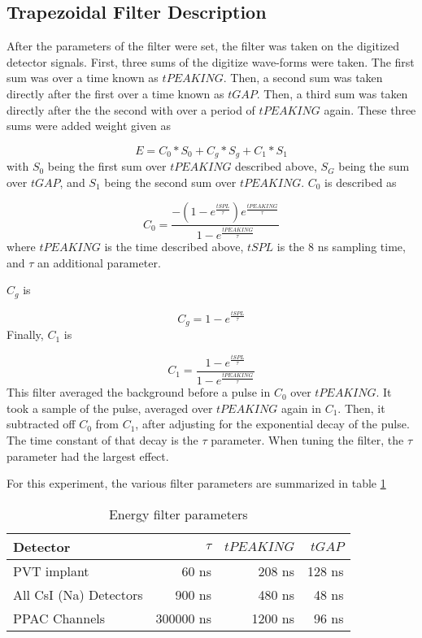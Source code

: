 \documentclass[../MaxHughesThesis.tex]{subfiles}
\begin{document}
\subsection{Trapezoidal Filter Description}
After the parameters of the filter were set, the filter was taken on the digitized detector signals.
First, three sums of the digitize wave-forms were taken.
The first sum was over a time known as $tPEAKING$.
Then, a second sum was taken directly after the first over a time known as $tGAP$.
Then, a third sum was taken directly after the the second with over a period of $tPEAKING$ again.
These three sums were added weight given as  

\begin{equation}
	E = C_{0} * S_{0} + C_{g} * S_{g} + C_{1} * S_{1} 
	\label{eq:ensum}
\end{equation} 
%
with $S_{0}$ being the first sum over $tPEAKING$ described above, $S_{G}$ being the sum over $tGAP$, and $S_{1}$ being the second sum over $tPEAKING$.
$C_{0}$ is described as

\begin{equation}
	C_{0} = \frac{-(1 - e^{\frac{tSPL}{\tau}})e^{\frac{tPEAKING}{\tau}}}{1 - e^{\frac{tPEAKING}{\tau}}}
	\label{eq:c0sum}
\end{equation}
%
where $tPEAKING$ is the time described above, $tSPL$ is the 8 ns sampling time, and $\tau$ an additional parameter.

$C_{g}$ is 

\begin{equation}
	C_{g} = 1 - e^{\frac{tSPL}{\tau}}
	\label{eq:cgsum}
\end{equation}
%
Finally, $C_{1}$ is 

\begin{equation}
	C_{1} = \frac{1 - e^{\frac{tSPL}{\tau}}}{1 - e^{\frac{tPEAKING}{\tau}}}
	\label{eq:c1sum}
\end{equation}
%
This filter averaged the background before a pulse in $C_{0}$ over $tPEAKING$.
It took a sample of the pulse, averaged over $tPEAKING$ again in $C_{1}$.
Then, it subtracted off $C_{0}$ from $C_{1}$, after adjusting for the exponential decay of the pulse.
The time constant of that decay is the $\tau$ parameter.
When tuning the filter, the $\tau$ parameter had the largest effect.

For this experiment, the various filter parameters are summarized in table \ref{tab:pixieparams}  
%
\begin{table}[!hbt]
	\centering
	\caption{Energy filter parameters}
			\begin{tabular}{lrrr}
			Detector & $\tau$ & $tPEAKING$ & $tGAP$ \\ \hline
			PVT implant & 60 ns & 208 ns & 128 ns \\
			All CsI (Na) Detectors & 900 ns & 480 ns & 48 ns \\
			PPAC Channels & 300000 ns & 1200 ns & 96 ns  
			\end{tabular}	
			\label{tab:pixieparams}
\end{table}
%
\end{document}

